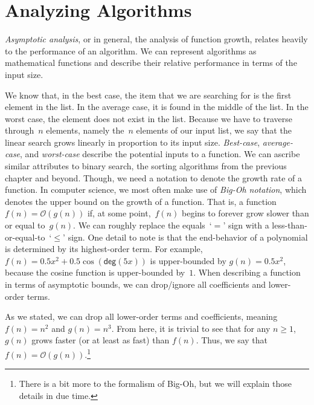 \section{Analyzing Algorithms}

\emph{Asymptotic analysis}, or in general, the analysis of function growth, relates heavily to the performance of an algorithm. 
We can represent algorithms as mathematical functions and describe their relative performance in terms of the input size. 

We know that, in the best case, the item that we are searching for is the first element in the list. 
In the average case, it is found in the middle of the list. In the worst case, the element does not exist in the list. 
Because we have to traverse through~$n$ elements, namely the~$n$ elements of our input list, we say that the linear search grows linearly in proportion to its input size. \emph{Best-case}, \emph{average-case}, and \emph{worst-case} describe the potential inputs to a function. 
We can ascribe similar attributes to binary search, the sorting algorithms from the previous chapter and beyond. 
Though, we need a notation to denote the growth rate of a function. 
In computer science, we most often make use of \emph{Big-Oh notation}, which denotes the upper bound on the growth of a function. 
That is, a function $f(n) = \mathcal{O}(g(n))$ if, at some point,~$f(n)$ begins to forever grow slower than or equal to~$g(n)$. 
We can roughly replace the equals~`$=$' sign with a less-than-or-equal-to~`$\leq$' sign. 
One detail to note is that the end-behavior of a polynomial is determined by its highest-order term. 
For example, $f(n) = 0.5x^2 + 0.5\cos(\textsf{deg}(5x))$ is upper-bounded by $g(n) = 0.5x^2$, because the cosine function is upper-bounded by~$1$. 
When describing a function in terms of asymptotic bounds, we can drop/ignore all coefficients and lower-order terms.

As we stated, we can drop all lower-order terms and coefficients, meaning $f(n) = n^2$ and $g(n) = n^3$. 
From here, it is trivial to see that for any $n \geq 1$, $g(n)$ grows faster (or at least as fast) than $f(n)$.
Thus, we say that $f(n) = \mathcal{O}(g(n))$.\footnote{There is a bit more to the formalism of Big-Oh, but we will explain those details in due time.}

